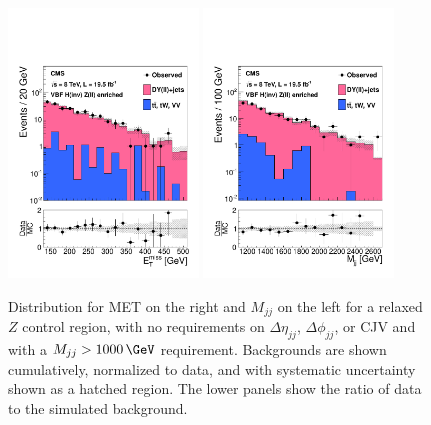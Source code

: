 \begin{figure}[!htb]
\centering
\includegraphics[width=0.45\textwidth]{Chapter05/Images/ZCtrlMET.pdf}
\includegraphics[width=0.45\textwidth]{Chapter05/Images/ZCtrlMjj.pdf}   
\caption{Distribution for \gls{MET} on the right and $M_{jj}$ on the left for a relaxed $Z$ control region, with no requirements on $\Delta\eta_{jj}$, $\Delta\phi_{jj}$, or \gls{CJV} and with a $M_{jj}>1000\,\GeV$ requirement. Backgrounds are shown cumulatively, normalized to data, and with systematic uncertainty shown as a hatched region. The lower panels show the ratio of data to the simulated background. \cite{ARTICLE:CMSVBFHiggsToInvAndZHCombination}}
\label{FIGURE:PromptDataAnalysis_BackgroundEstimation_ZControlRegion}
\end{figure}

